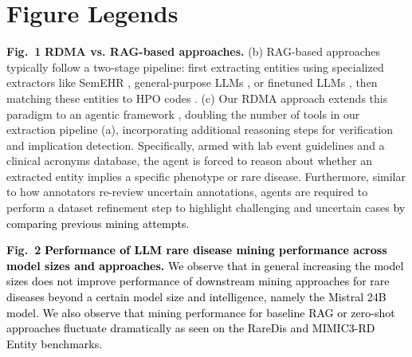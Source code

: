 \documentclass[pdflatex,sn-mathphys-num]{sn-jnl}%
\newcommand{\rev}[1]{\textcolor{black}{#1}}
\theoremstyle{thmstyleone}%
\theoremstyle{thmstyletwo}%
\theoremstyle{thmstylethree}%
\begin{document}


\section*{Figure Legends}

\setlength{\parskip}{1.5em}

\noindent\textbf{Fig.~1} \textbf{RDMA vs. RAG-based approaches.} (b) RAG-based approaches \cite{garcia2024_HPORAG, wu2024hybrid, yang2023enhancingphenotyperecognitionclinical} typically follow a two-stage pipeline: first extracting entities using specialized extractors like SemEHR \cite{wu2024hybrid, wu2018semehr}, general-purpose LLMs \cite{garcia2024_HPORAG}, or finetuned LLMs \cite{yang2023enhancingphenotyperecognitionclinical}, then matching these entities to HPO codes \cite{wu2018semehr, wu2024hybrid, yang2023enhancingphenotyperecognitionclinical}. (c) Our RDMA approach extends this paradigm to an agentic framework \cite{wang2024survey_agents}, doubling the number of tools in our extraction pipeline (a), incorporating additional reasoning steps for verification and implication detection. Specifically, armed with lab event guidelines and a clinical acronyms database, the agent is forced to reason about whether an extracted entity implies a specific phenotype or rare disease. Furthermore, similar to how annotators re-review uncertain annotations, agents are required to perform a dataset refinement step to highlight challenging and uncertain cases \rev{by comparing previous mining attempts}.

\noindent\textbf{Fig.~2} \rev{\textbf{Performance of LLM rare disease mining performance across model sizes and approaches.} We observe that in general increasing the model sizes does not improve performance of downstream mining approaches for rare diseases beyond a certain model size and intelligence, namely the Mistral 24B model. We also observe that mining performance for baseline RAG or zero-shot approaches fluctuate dramatically as seen on the RareDis and MIMIC3-RD Entity benchmarks.}
\end{document}

